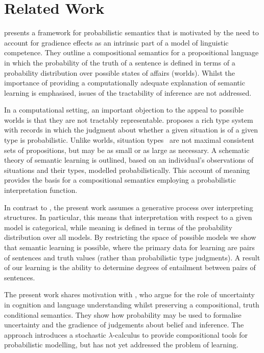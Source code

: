 \documentclass[manuscript]{clv2}
\newcommand{\newcite}[1]{\namecite{#1}}
\begin{document}

\section{Related Work}


\newcite{Eijck:12} presents a framework for probabilistic semantics that is motivated by the need to account for gradience effects as an intrinsic part of a model of linguistic competence. They outline a compositional semantics for a propositional language in which the probability of the truth of a sentence is defined in terms of a probability distribution over possible states of affairs (worlds). Whilst the importance of providing a computationally adequate explanation of semantic learning is emphasised, issues of the tractability of inference are not addressed. 

In a computational setting, an important objection to the appeal to possible worlds is that they are not tractably representable. \newcite{Cooper:14}  proposes a rich type system with records in which the judgment about whether a given situation is of a given type is probabilistic. Unlike worlds, situation types~\cite{Barwise:83} are not maximal consistent sets of propositions, but may be as small or as large as necessary. A schematic theory of semantic learning is outlined, based on an individual's observations of situations and their types, modelled probabilistically. This account of meaning provides the basis for a compositional semantics employing a probabilistic interpretation function. 

In contrast to \cite{Cooper:14}, the present work assumes a generative process over interpreting structures. In particular, this means that interpretation with respect to a given model is categorical, while meaning is defined in terms of the probability distribution over all models. By restricting the space of possible models we show that semantic learning is possible, where the primary data for learning are pairs of sentences and truth values (rather than probabilistic type judgments). A result of our learning is the ability to determine degrees of entailment between pairs of sentences.

The present work shares motivation with \newcite{Goodman:14}, who argue for the role of uncertainty in cognition and language understanding whilst preserving a compositional, truth conditional semantics. They show how probability may be used to formalise uncertainty and the gradience of judgements about belief and inference. The approach introduces a stochastic $\lambda$-calculus to provide compositional tools for probabilistic modelling,
but has not yet addressed the problem of learning.
\end{document}

